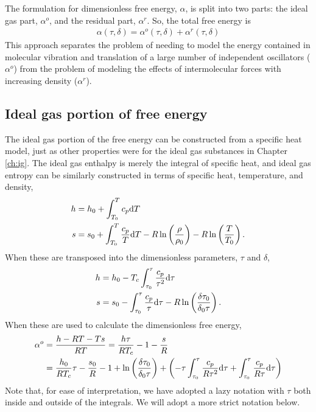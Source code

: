 The formulation for dimensionless free energy, $\alpha$, is split into two parts: the ideal gas part, $\alpha^o$, and the residual part, $\alpha^r$.  So, the total free energy is
\begin{align}
\alpha(\tau, \delta) = \alpha^o(\tau, \delta) + \alpha^r(\tau, \delta)
\end{align}
This approach separates the problem of needing to model the energy contained in molecular vibration and translation of a large number of independent oscillators ($\alpha^o$) from the problem of modeling the effects of intermolecular forces with increasing density ($\alpha^r$).

\subsection{Ideal gas portion of free energy}
The ideal gas portion of the free energy can be constructed from a specific heat model, just as other properties were for the ideal gas substances in Chapter \ref{ch:ig}.  The ideal gas enthalpy is merely the integral of specific heat, and ideal gas entropy can be similarly constructed in terms of specific heat, temperature, and density,
\begin{subequations}
\begin{align}
h &= h_0 + \int_{T_0}^T c_p \mathrm{d} T\\
s &= s_0 + \int_{T_0}^T \frac{c_p}{T} \mathrm{d} T - R \ln\left(\frac{\rho}{\rho_0}\right) - R\ln\left(\frac{T}{T_0}\right).
\end{align}
\end{subequations}
When these are transposed into the dimensionless parameters, $\tau$ and $\delta$,
\begin{align*}
h &= h_0 - T_c \int_{\tau_0}^\tau \frac{c_p}{\tau^2} \mathrm{d} \tau\\
s &= s_0 - \int_{\tau_0}^\tau \frac{c_p}{\tau} \mathrm{d} \tau - R \ln\left(\frac{\delta \tau_0}{\delta_0 \tau}\right).
\end{align*}
When these are used to calculate the dimensionless free energy,
\begin{align}
\alpha^o &= \frac{h - RT - Ts}{RT} = \frac{h \tau}{R T_c} - 1 - \frac{s}{R}\nonumber\\
 &= \frac{h_0}{RT_c} \tau - \frac{s_0}{R} - 1 + \ln\left(\frac{\delta \tau_0}{\delta_0 \tau}\right) + \left(-\tau\int_{\tau_0}^\tau \frac{c_p}{R \tau^2} \mathrm{d} \tau + \int_{\tau_0}^\tau \frac{c_p}{R \tau} \mathrm{d} \tau \right)\label{eqn:mp1:aodef}
\end{align}
Note that, for ease of interpretation, we have adopted a lazy notation with $\tau$ both inside and outside of the integrals.  We will adopt a more strict notation below.


